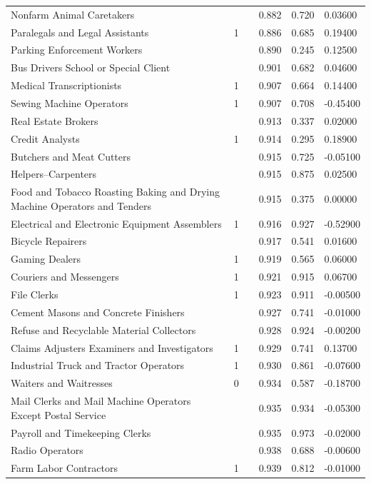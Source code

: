 \documentclass[11pt]{report}
\numberwithin{equation}{chapter}
\begin{document}
\begin{spacing}{2}
\begin{longtable}{ p{} p{} p{}  p{}  p{}  p{} }
Nonfarm Animal Caretakers	&		&	&	0.882	&	0.720	&	0.03600	\\
Paralegals and Legal Assistants	&	1	&	&	0.886	&	0.685	&	0.19400	\\
Parking Enforcement Workers	&		&	&	0.890	&	0.245	&	0.12500	\\
Bus Drivers School or Special Client	&		&	&	0.901	&	0.682	&	0.04600	\\
Medical Transcriptionists	&	1	&	&	0.907	&	0.664	&	0.14400	\\
Sewing Machine Operators	&	1	&	&	0.907	&	0.708	&	-0.45400	\\
Real Estate Brokers	&		&	&	0.913	&	0.337	&	0.02000	\\
Credit Analysts	&	1	&	&	0.914	&	0.295	&	0.18900	\\
Butchers and Meat Cutters	&		&	&	0.915	&	0.725	&	-0.05100	\\
Helpers--Carpenters	&		&	&	0.915	&	0.875	&	0.02500	\\
Food and Tobacco Roasting Baking and Drying Machine Operators and Tenders	&		&	&	0.915	&	0.375	&	0.00000	\\
Electrical and Electronic Equipment Assemblers	&	1	&	&	0.916	&	0.927	&	-0.52900	\\
Bicycle Repairers	&		&	&	0.917	&	0.541	&	0.01600	\\
Gaming Dealers	&	1	&	&	0.919	&	0.565	&	0.06000	\\
Couriers and Messengers	&	1	&	&	0.921	&	0.915	&	0.06700	\\
File Clerks	&	1	&	&	0.923	&	0.911	&	-0.00500	\\
Cement Masons and Concrete Finishers	&		&	&	0.927	&	0.741	&	-0.01000	\\
Refuse and Recyclable Material Collectors	&		&	&	0.928	&	0.924	&	-0.00200	\\
Claims Adjusters Examiners and Investigators	&	1	&	&	0.929	&	0.741	&	0.13700	\\
Industrial Truck and Tractor Operators	&	1	&	&	0.930	&	0.861	&	-0.07600	\\
Waiters and Waitresses	&	0	&	&	0.934	&	0.587	&	-0.18700	\\
Mail Clerks and Mail Machine Operators Except Postal Service	&		&	&	0.935	&	0.934	&	-0.05300	\\
Payroll and Timekeeping Clerks	&		&	&	0.935	&	0.973	&	-0.02000	\\
Radio Operators	&		&	&	0.938	&	0.688	&	-0.00600	\\
Farm Labor Contractors	&	1	&	&	0.939	&	0.812	&	-0.01000	\\

\end{longtable}
\end{spacing}
\end{document}
